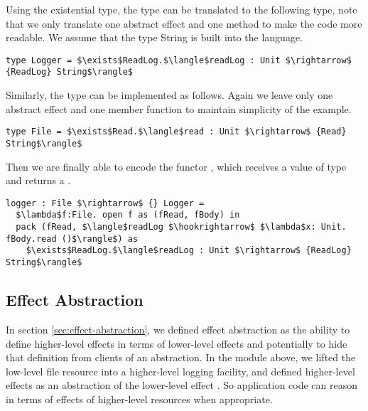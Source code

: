 Using the existential type, the type  can be translated to the following type, note that we only translate one abstract effect  and one method  to make the code more readable. We assume that the type String is built into the language.
\begin{lstlisting}[mathescape=true]
type Logger = $\exists$ReadLog.$\langle$readLog : Unit $\rightarrow$ {ReadLog} String$\rangle$
\end{lstlisting}

Similarly, the  type can be implemented as follows. Again we leave only one abstract effect and one member function to maintain simplicity of the example.
\begin{lstlisting}[mathescape=true]
type File = $\exists$Read.$\langle$read : Unit $\rightarrow$ {Read} String$\rangle$
\end{lstlisting}

Then we are finally able to encode the functor , which receives a value of type  and returns a . 

\begin{lstlisting}[mathescape=true]
logger : File $\rightarrow$ {} Logger = 
  $\lambda$f:File. open f as (fRead, fBody) in 
  pack (fRead, $\langle$readLog $\hookrightarrow$ $\lambda$x: Unit. fBody.read ()$\rangle$) as
    $\exists$ReadLog.$\langle$readLog : Unit $\rightarrow$ {ReadLog} String$\rangle$
\end{lstlisting}

\subsection{Effect Abstraction}

In section  \ref{sec:effect-abstraction},  we defined effect abstraction as the ability to define higher-level effects in terms of lower-level effects and potentially to hide that definition from clients of an abstraction. In the  module above, we lifted the low-level file resource into a higher-level logging facility, and defined higher-level effects  as an abstraction of the lower-level effect . So application code can reason in terms of effects of higher-level resources when appropriate.




